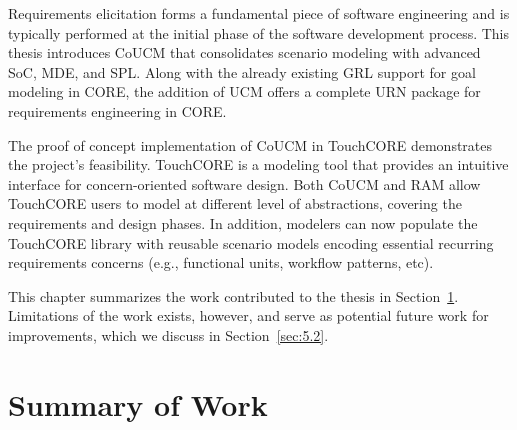 Requirements elicitation forms a fundamental piece of software engineering and is typically performed at the initial phase of the software development process. This thesis introduces CoUCM that consolidates scenario modeling with advanced SoC, MDE, and SPL. Along with the already existing GRL support for goal modeling in CORE, the addition of UCM offers a complete URN package for requirements engineering in CORE.

The proof of concept implementation of CoUCM in TouchCORE demonstrates the project's feasibility. TouchCORE is a modeling tool that provides an intuitive interface for concern-oriented software design. Both CoUCM and RAM allow TouchCORE users to model at different level of abstractions, covering the requirements and design phases. In addition, modelers can now populate the TouchCORE library with reusable scenario models encoding essential recurring requirements concerns (e.g., functional units, workflow patterns, etc).

This chapter summarizes the work contributed to the thesis in Section~\ref{sec:5.1}. Limitations of the work exists, however, and serve as potential future work for improvements, which we discuss in Section~\ref{sec:5.2}.

\section{Summary of Work} \label{sec:5.1}

